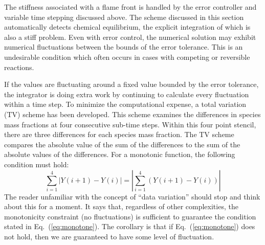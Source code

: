 The stiffness associated with a flame front is handled by the error controller and variable time stepping discussed above. The scheme discussed in this section automatically detects chemical equilibrium, the explicit integration of which is also a stiff problem.  Even with error control, the numerical solution may exhibit numerical fluctuations between the bounds of the error tolerance.  This is an undesirable condition which often occurs in cases with competing or reversible reactions.

If the values are fluctuating around a fixed value bounded by the error tolerance, the integrator is doing extra work by continuing to calculate every fluctuation within a time step. To minimize the computational expense, a total variation (TV) scheme has been developed. This scheme examines the differences in species mass fractions at four consecutive sub-time steps. Within this four point stencil, there are three differences for each species mass fraction. The TV scheme compares the absolute value of the sum of the differences to the sum of the absolute values of the differences.  For a monotonic function, the following condition must hold:
\begin{equation}\label{eq:monotone}
\sum_{i=1}^{4}|Y(i+1)-Y(i)| = |\sum_{i=1}^{4}(Y(i+1)-Y(i))|
\end{equation}
The reader unfamiliar with the concept of ``data variation'' should stop and think about this for a moment.  It says that, regardless of other complexities, the monotonicity constraint (no fluctuations) is sufficient to guarantee the condition stated in Eq.~(\ref{eq:monotone}).  The corollary is that if Eq.~(\ref{eq:monotone}) does not hold, then we are guaranteed to have some level of fluctuation.

